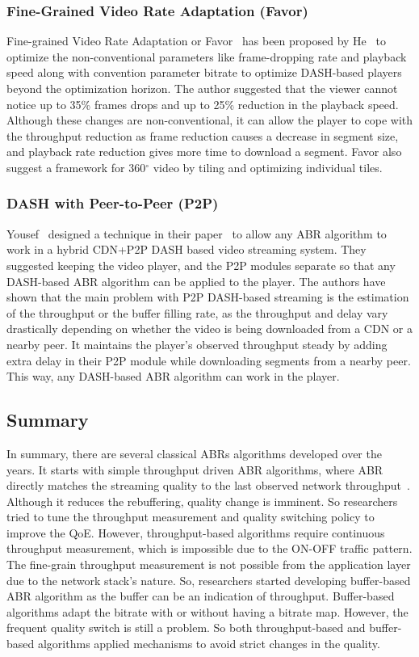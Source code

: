 \subsubsection{Fine-Grained Video Rate Adaptation (Favor)}
Fine-grained Video Rate Adaptation or Favor~\cite{10.1145/3204949.3204957} has been proposed by He \etal\ to optimize the non-conventional parameters like frame-dropping rate and playback speed along with convention parameter bitrate to optimize DASH-based players beyond the optimization horizon. The author suggested that the viewer cannot notice up to 35\% frames drops and up to 25\% reduction in the playback speed. Although these changes are non-conventional, it can allow the player to cope with the throughput reduction as frame reduction causes a decrease in segment size, and playback rate reduction gives more time to download a segment. Favor also suggest a framework for 360$^{\circ}$ video by tiling and optimizing individual tiles.

\subsubsection{DASH with Peer-to-Peer (P2P)}
Yousef \etal\ designed a technique in their paper~\cite{10.1145/3339825.3391859} to allow any ABR algorithm to work in a hybrid CDN+P2P DASH based video streaming system. They suggested keeping the video player, and the P2P modules separate so that any DASH-based ABR algorithm can be applied to the player. The authors have shown that the main problem with P2P DASH-based streaming is the estimation of the throughput or the buffer filling rate, as the throughput and delay vary drastically depending on whether the video is being downloaded from a CDN or a nearby peer. It maintains the player's observed throughput steady by adding extra delay in their P2P module while downloading segments from a nearby peer. This way, any DASH-based ABR algorithm can work in the player.

\subsection{Summary}
In summary, there are several classical ABRs algorithms developed over the years. It starts with simple throughput driven ABR algorithms, where ABR directly matches the streaming quality to the last observed network throughput~\cite{5677508,10.1145/1943552.1943575,10.1145/1943552.1943574}. Although it reduces the rebuffering, quality change is imminent. So researchers tried to tune the throughput measurement and quality switching policy to improve the QoE. However, throughput-based algorithms require continuous throughput measurement, which is impossible due to the ON-OFF traffic pattern. The fine-grain throughput measurement is not possible from the application layer due to the network stack's nature. So, researchers started developing buffer-based ABR algorithm as the buffer can be an indication of throughput. Buffer-based algorithms adapt the bitrate with or without having a bitrate map. However, the frequent quality switch is still a problem. So both throughput-based and buffer-based algorithms applied mechanisms to avoid strict changes in the quality.

